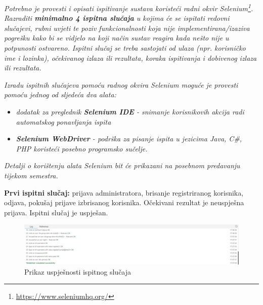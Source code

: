			 \textit{Potrebno je provesti i opisati ispitivanje sustava koristeći radni okvir Selenium\footnote{\url{https://www.seleniumhq.org/}}. Razraditi \textbf{minimalno 4 ispitna slučaja} u kojima će se ispitati redovni slučajevi, rubni uvjeti te poziv funkcionalnosti koja nije implementirana/izaziva pogrešku kako bi se vidjelo na koji način sustav reagira kada nešto nije u potpunosti ostvareno. Ispitni slučaj se treba sastojati od ulaza (npr. korisničko ime i lozinka), očekivanog izlaza ili rezultata, koraka ispitivanja i dobivenog izlaza ili rezultata.\\ }
			 
			 \textit{Izradu ispitnih slučajeva pomoću radnog okvira Selenium moguće je provesti pomoću jednog od sljedeća dva alata:}
			 \begin{itemize}
			 	\item \textit{dodatak za preglednik \textbf{Selenium IDE} - snimanje korisnikovih akcija radi automatskog ponavljanja ispita	}
			 	\item \textit{\textbf{Selenium WebDriver} - podrška za pisanje ispita u jezicima Java, C\#, PHP koristeći posebno programsko sučelje.}
			 \end{itemize}
		 	\textit{Detalji o korištenju alata Selenium bit će prikazani na posebnom predavanju tijekom semestra.}
		 	
		 	\textbf{Prvi ispitni slučaj:} prijava administratora, brisanje registriranog korisnika, odjava, pokušaj prijave izbrisanog korisnika. Očekivani rezultat je neuspješna prijava. Ispitni slučaj je uspješan.
		 	
		 	\begin{figure} [hbt!]
		 		\includegraphics[width=\linewidth]{Slike/deleteUser}
		 		\caption{Prikaz uspješnosti ispitnog slučaja}
		 	\end{figure}
		 	
